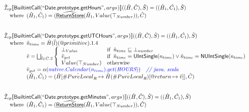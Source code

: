 \documentclass{article}
\makeatletter
\newcommand{\SF}[1]{\mbox{\textsf{#1}}}
\newcommand{\comment}[1]{\textit{#1}}
\newcommand{\wherec}[1]{{\rm where}\begin{array}[t]{l}#1\end{array}}
\newcommand{\ifc}[1]{{\rm if}\begin{array}[t]{l}#1\end{array}}
\newcommand{\owc}{{\rm otherwise}}
\newcommand{\aI}{\hat{\mathcal{I}}}
\newcommand{\lbr}{\llbracket}
\newcommand{\rbr}{\rrbracket}
\newcommand{\ahf}[1]{\widehat{\underline{\sf #1}}}
\newcommand{\varprop}[1]{@#1}
\newcommand{\avarloc}[1]{\hat{\##1}}
\newcommand{\avarprop}[1]{\hat{@#1}}
\def\inblue{\color{blue}}
\def\inblue{\color{blue}}
\makeatother
\begin{document}
\[
\begin{array}{l}


\aI _{cp}\lbr \SF{BuiltintCall}(``\SF{Date.prototype.getHours}",args_{})\rbr((\hat{H},\hat{C}), \hat{S})
  = ((\hat{H}_1, \hat{C_1}), \hat{S})\\
\quad\wherec{
  (\hat{H}_1, \hat{C}_1) = (\ahf{ReturnStore}(\hat{H}_1, Value(\top_{Number})), \hat{C})
  }\\
\\\\

\aI _{cp}\lbr \SF{BuiltintCall}(``\SF{Date.prototype.getUTCHours}",args_{})\rbr((\hat{H},\hat{C}), \hat{S})
  = ((\hat{H}_1, \hat{C_1}), \hat{S})\\
\quad\wherec{
  \hat{n}_{time} = \hat{H}(\hat{l})(\avarprop{primitive}).1.4\\
  \hat{v} = \bigsqcup_{\hat{l} \in \hat{C}.2} \left\{\begin{array}{ll}
      \bot_{Value} & \ifc{\hat{n}_{time} \sqsubseteq  \bot_{number}}\\
      \hat{v}_{get} &
      \ifc{\hat{n}_{time} = \SF{UIntSingle}(n_{time}) \lor\hat{n}_{time} = \SF{NUIntSingle}(n_{time}) }\\
      Value(\top_{Number}) & \owc
    \end{array}\right.\\
  \hat{v}_{get} = \alpha({\inblue native.Calendar(n_{time}).get(\emph{HOURS})})
    \quad\comment{{\inblue // java, scala}}\\  
  (\hat{H}_1, \hat{C}_1) = 
    (\hat{H}[\avarloc{PureLocal}_R \mapsto \hat{H}(\avarloc{PureLocal}_R)
      [\varprop{return} \mapsto \hat{v}]], \hat{C})\\
  }\\
\\\\

\aI _{cp}\lbr \SF{BuiltintCall}(``\SF{Date.prototype.getMinutes}",args_{})\rbr((\hat{H},\hat{C}), \hat{S})
  = ((\hat{H}_1, \hat{C_1}), \hat{S})\\
\quad\wherec{
  (\hat{H}_1, \hat{C}_1) = (\ahf{ReturnStore}(\hat{H}_1, Value(\top_{Number})), \hat{C})
  }\\
\\\\


\end{array}\]
\end{document}
